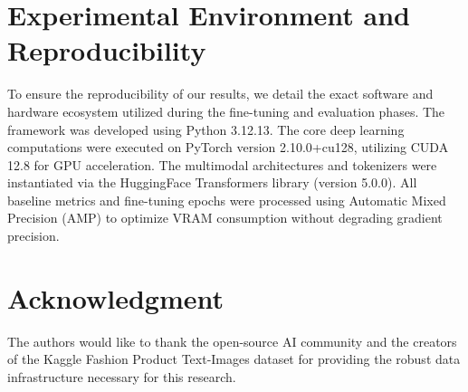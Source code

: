 \documentclass[conference]{IEEEtran}
\begin{document}
\appendices
\section{Experimental Environment and Reproducibility}
To ensure the reproducibility of our results, we detail the exact software and hardware ecosystem utilized during the fine-tuning and evaluation phases. The framework was developed using Python 3.12.13. The core deep learning computations were executed on PyTorch version 2.10.0+cu128, utilizing CUDA 12.8 for GPU acceleration. The multimodal architectures and tokenizers were instantiated via the HuggingFace Transformers library (version 5.0.0). All baseline metrics and fine-tuning epochs were processed using Automatic Mixed Precision (AMP) to optimize VRAM consumption without degrading gradient precision.

\section*{Acknowledgment}
The authors would like to thank the open-source AI community and the creators of the Kaggle Fashion Product Text-Images dataset for providing the robust data infrastructure necessary for this research.



\end{document}
